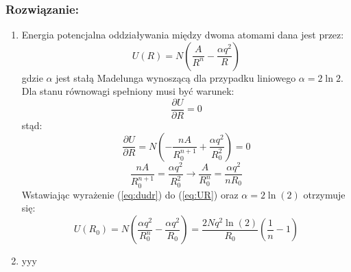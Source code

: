 \subsubsection*{Rozwiązanie:}
\begin{enumerate}
\item Energia potencjalna oddziaływania między dwoma atomami dana jest przez:
\begin{equation}
\label{eq:UR}
U(R) = N\left( \frac{A}{R^n} - \frac{\alpha q^2}{R} \right)
\end{equation}
gdzie $\alpha$ jest stałą Madelunga wynoszącą dla przypadku liniowego $\alpha = 2\ln 2$.\\
Dla stanu równowagi spełniony musi być warunek:
\begin{equation}
\frac{\partial U}{\partial R} = 0
\end{equation}
stąd:
\begin{equation}
\frac{\partial U}{\partial R} = N \left( -\frac{nA}{R_0^{n+1}} + \frac{\alpha q^2}{R_0^2} \right)= 0
\end{equation}
\begin{equation}
\label{eq:dudr}
\frac{nA}{R_0^{n+1}} = \frac{\alpha q^2}{R_0^2} \rightarrow \frac{A}{R_0^n} = \frac{\alpha q^2}{n R_0}
\end{equation}
Wstawiając wyrażenie (\ref{eq:dudr}) do (\ref{eq:UR}) oraz $\alpha=2\ln(2)$ otrzymuje się:
\begin{equation}
U(R_0) = N \left( \frac{\alpha q^2}{R_0^n} - \frac{\alpha q^2}{R_0} \right) = \frac{2Nq^2\ln(2)}{R_0} \left( \frac{1}{n} -1 \right)
\end{equation}
\hrulefill
\item yyy
\end{enumerate}
